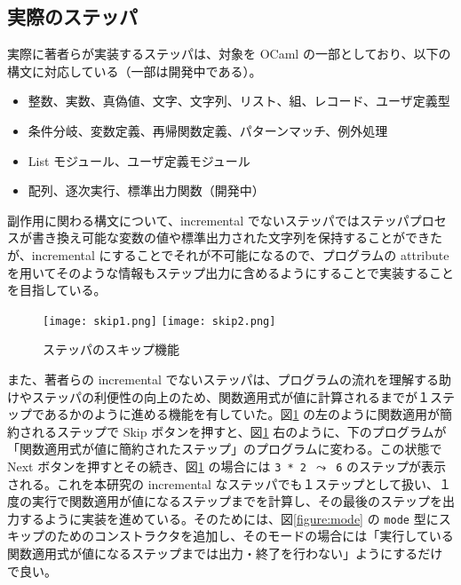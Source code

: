 \subsection{実際のステッパ}
\label{実装-実際のステッパ}

実際に著者らが実装するステッパは、対象を OCaml の一部としており、以下の構文に対応している（一部は開発中である）。
\begin{itemize}
\item 整数、実数、真偽値、文字、文字列、リスト、組、レコード、ユーザ定義型
\item 条件分岐、変数定義、再帰関数定義、パターンマッチ、例外処理
\item List モジュール、ユーザ定義モジュール
\item 配列、逐次実行、標準出力関数（開発中）
\end{itemize}

副作用に関わる構文について、incremental でないステッパ\cite{FSA18}ではステッパプロセスが書き換え可能な変数の値や標準出力された文字列を保持することができたが、incremental にすることでそれが不可能になるので、プログラムの attribute を用いてそのような情報もステップ出力に含めるようにすることで実装することを目指している。

\begin{figure}
  \texttt{[image: skip1.png]}
  \texttt{[image: skip2.png]}
  \caption{ステッパのスキップ機能}
  \label{figure:skip}
\end{figure}

また、著者らの incremental でないステッパ\cite{FSA18}は、プログラムの流れを理解する助けやステッパの利便性の向上のため、関数適用式が値に計算されるまでが１ステップであるかのように進める機能を有していた。図\ref{figure:skip} の左のように関数適用が簡約されるステップで Skip ボタンを押すと、図\ref{figure:skip} 右のように、下のプログラムが「関数適用式が値に簡約されたステップ」のプログラムに変わる。この状態で Next ボタンを押すとその続き、図\ref{figure:skip} の場合には \texttt{3 * 2 $\leadsto$ 6} のステップが表示される。これを本研究の incremental なステッパでも１ステップとして扱い、１度の実行で関数適用が値になるステップまでを計算し、その最後のステップを出力するように実装を進めている。そのためには、図\ref{figure:mode} の \texttt{mode} 型にスキップのためのコンストラクタを追加し、そのモードの場合には「実行している関数適用式が値になるステップまでは出力・終了を行わない」ようにするだけで良い。
